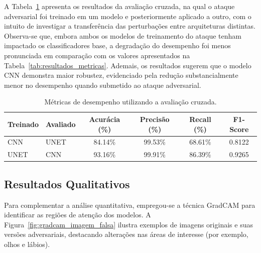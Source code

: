 \documentclass[12pt]{article}
\begin{document}
A Tabela~\ref{tab:resultados_cruzada} apresenta os resultados da avaliação
cruzada, na qual o ataque adversarial foi treinado em um modelo e
posteriormente aplicado a outro, com o intuito de investigar a transferência
das perturbações entre arquiteturas distintas. Observa-se que, embora ambos os
modelos de treinamento do ataque tenham impactado os classificadores base, a
degradação do desempenho foi menos pronunciada em comparação com os valores
apresentados na Tabela~\ref{tab:resultados_metricas}. Ademais, os resultados
sugerem que o modelo CNN demonstra maior robustez, evidenciado pela redução
substancialmente menor no desempenho quando submetido ao ataque adversarial.

\begin{table}[htbp]
    \centering
    \caption{Métricas de desempenho utilizando a avaliação cruzada.}\label{tab:resultados_cruzada}
    \begin{tabular}{llcccc}
        \hline
        \textbf{Treinado} & \textbf{Avaliado} & \textbf{Acurácia (\%)} & \textbf{Precisão (\%)} & \textbf{Recall (\%)} & \textbf{F1-Score} \\

        \hline
        CNN               & UNET              & 84.14\%                & 99.53\%                & 68.61\%              & 0.8122            \\
        UNET              & CNN               & 93.16\%                & 99.91\%                & 86.39\%              & 0.9265            \\
        \hline
    \end{tabular}
\end{table}

\subsection{Resultados Qualitativos}
Para complementar a análise quantitativa, empregou-se a técnica GradCAM para
identificar as regiões de atenção dos modelos. A
Figura~\ref{fig:gradcam_imagem_falsa} ilustra exemplos de imagens originais e
suas versões adversariais, destacando alterações nas áreas de interesse (por
exemplo, olhos e lábios).
\end{document}
